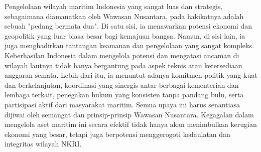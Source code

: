 \documentclass[12pt, a4paper]{article}
\begin{document}
Pengelolaan wilayah maritim Indonesia yang sangat luas dan strategis, sebagaimana diamanatkan oleh Wawasan Nusantara, pada hakikatnya adalah sebuah "pedang bermata dua". Di satu sisi, ia menawarkan potensi ekonomi dan geopolitik yang luar biasa besar bagi kemajuan bangsa. Namun, di sisi lain, ia juga menghadirkan tantangan keamanan dan pengelolaan yang sangat kompleks. Keberhasilan Indonesia dalam mengelola potensi dan mengatasi ancaman di wilayah lautnya tidak hanya bergantung pada aspek teknis atau ketersediaan anggaran semata. Lebih dari itu, ia menuntut adanya komitmen politik yang kuat dan berkelanjutan, koordinasi yang sinergis antar berbagai kementerian dan lembaga terkait, penegakan hukum yang konsisten tanpa pandang bulu, serta partisipasi aktif dari masyarakat maritim. Semua upaya ini harus senantiasa dijiwai oleh semangat dan prinsip-prinsip Wawasan Nusantara. Kegagalan dalam mengelola aset maritim ini secara efektif tidak hanya akan menimbulkan kerugian ekonomi yang besar, tetapi juga berpotensi menggerogoti kedaulatan dan integritas wilayah NKRI.
\end{document}
